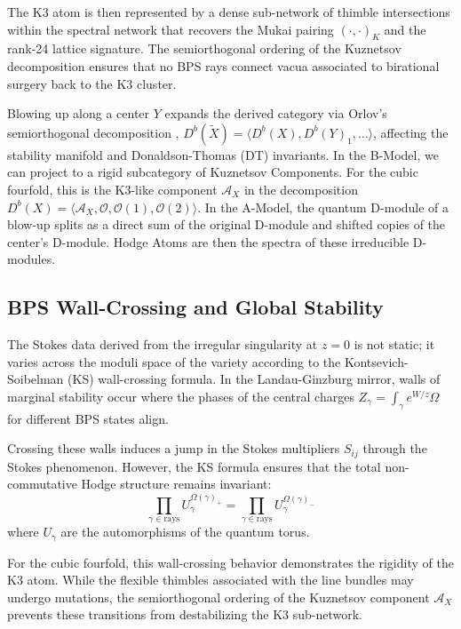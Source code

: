\documentclass[12pt,reqno]{amsart}
\theoremstyle{remark} \newtheorem{remark}[theorem]{Remark}
\begin{document}
The K3 atom is then represented by a dense sub-network of thimble
intersections within the spectral network
that recovers the Mukai pairing $( \cdot, \cdot )_K$ and
the rank-24 lattice signature.  The semiorthogonal ordering of the Kuznetsov
decomposition ensures that no BPS rays connect vacua associated to birational
surgery back to the K3 cluster.

Blowing up along a center $Y$ expands the derived category via Orlov's
semiorthogonal decomposition \cite{Orlov1992}, $D^b(\tilde{X}) =
\langle D^b(X), D^b(Y)_1, \dots \rangle$, affecting the stability
manifold and Donaldson-Thomas (DT) invariants.
In the B-Model, we can project to a
      rigid subcategory of Kuznetsov Components.  For the cubic fourfold, this
      is the K3-like component $\mathcal{A}_X$ in the decomposition
      $D^b(X) = \langle \mathcal{A}_X, \mathcal{O}, \mathcal{O}(1),
      \mathcal{O}(2) \rangle$.  In the A-Model, the quantum
      D-module of a blow-up splits as a direct sum of the original
      D-module and shifted copies of the center's D-module.
Hodge Atoms are then the spectra of these irreducible D-modules.

\subsection{BPS Wall-Crossing and Global Stability}
The Stokes data derived from the irregular singularity at $z=0$ is not
static; it varies across the moduli space of the variety according to
the Kontsevich-Soibelman (KS) wall-crossing formula. In the
Landau-Ginzburg mirror, walls of marginal stability occur where the
phases of the central charges $Z_\gamma = \int_\gamma e^{W/z} \Omega$
for different BPS states align.

Crossing these walls induces a jump in the Stokes multipliers $S_{ij}$
through the Stokes phenomenon. However, the KS formula ensures that
the total non-commutative Hodge structure remains invariant:
\begin{equation}
    \prod_{\gamma \in \text{rays}} U_\gamma^{\Omega(\gamma)_{+}} =
    \prod_{\gamma \in \text{rays}} U_\gamma^{\Omega(\gamma)_{-}}
\end{equation}
where $U_\gamma$ are the automorphisms of the quantum torus.

For the cubic fourfold, this wall-crossing behavior demonstrates the
rigidity of the K3 atom. While the flexible thimbles associated with
the line bundles may undergo mutations, the semiorthogonal ordering of
the Kuznetsov component $\mathcal{A}_X$ prevents these transitions
from destabilizing the K3 sub-network.
\end{document}
